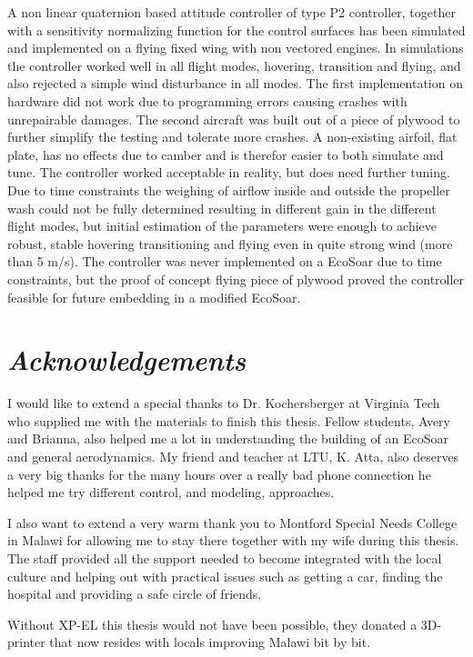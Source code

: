 \documentclass{article}
\begin{document}
\abstract
A non linear quaternion based attitude controller of type P2 controller, together with a sensitivity normalizing function for the control surfaces has been simulated and implemented on a flying fixed wing with non vectored engines.
In simulations the controller worked well in all flight modes, hovering, transition and flying, and also rejected a simple wind disturbance in all modes.
The first implementation on hardware did not work due to programming errors causing crashes with unrepairable damages.
The second aircraft was built out of a piece of plywood to further simplify the testing and tolerate more crashes.
A non-existing airfoil, flat plate, has no effects due to camber and is therefor easier to both simulate and tune.
The controller worked acceptable in reality, but does need further tuning.
Due to time constraints the weighing of airflow inside and outside the propeller wash could not be fully determined resulting in different gain in the different flight modes, but initial estimation of the parameters were enough to achieve robust, stable hovering transitioning and flying even in quite strong wind (more than 5 m/s).
The controller was never implemented on a EcoSoar due to time constraints, but the proof of concept flying piece of plywood proved the controller feasible for future embedding in a modified EcoSoar. 


\newpage
\section*{\textit{Acknowledgements}}

I would like to extend a special thanks to Dr. Kochersberger at Virginia Tech who supplied me with the materials to finish this thesis.
Fellow students, Avery and Brianna, also helped me a lot in understanding the building of an EcoSoar and general aerodynamics.
My friend and teacher at LTU, K. Atta, also deserves a very big thanks for the many hours over a really bad phone connection he helped me try different control, and modeling, approaches.

I also want to extend a very warm thank you to Montford Special Needs College in Malawi for allowing me to stay there together with my wife during this thesis.
The staff provided all the support needed to become integrated with the local culture and helping out with practical issues such as getting a car, finding the hospital and providing a safe circle of friends.

Without XP-EL this thesis would not have been possible, they donated a 3D-printer that now resides with locals improving Malawi bit by bit.
\end{document}
